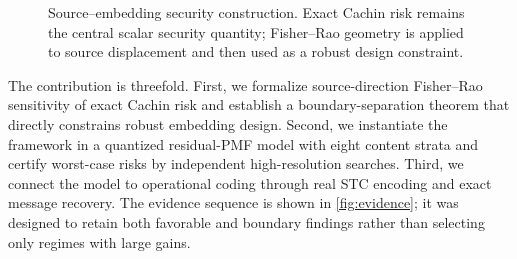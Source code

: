 \documentclass[10pt]{article}
\newcommand{\KL}{D_{\mathrm{KL}}}
\newcommand{\RR}{\mathcal{R}}
\newcommand{\FR}{\mathrm{FR}}
\begin{document}
\begin{figure}[t]
\centering
{}
\caption{Source--embedding security construction. Exact Cachin risk remains the central scalar security quantity; Fisher--Rao geometry is applied to source displacement and then used as a robust design constraint.}
\label{fig:framework}
\end{figure}

The contribution is threefold. First, we formalize source-direction Fisher--Rao sensitivity of exact Cachin risk and establish a boundary-separation theorem that directly constrains robust embedding design. Second, we instantiate the framework in a quantized residual-PMF model with eight content strata and certify worst-case risks by independent high-resolution searches. Third, we connect the model to operational coding through real STC encoding and exact message recovery. The evidence sequence is shown in \cref{fig:evidence}; it was designed to retain both favorable and boundary findings rather than selecting only regimes with large gains.
\end{document}
